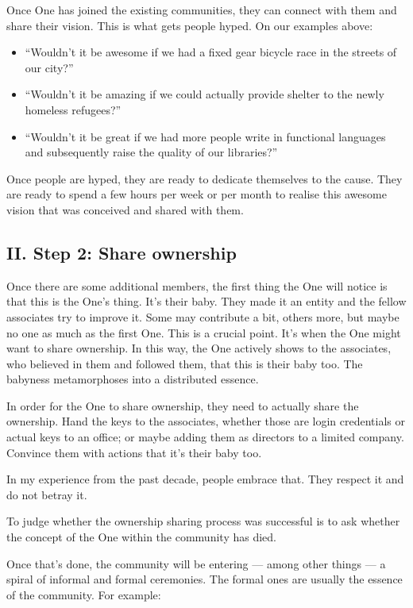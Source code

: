 Once One has joined the existing communities, they can connect with them and share their vision. This is what gets people hyped. On our examples above:

\begin{itemize}
    \item{“Wouldn’t it be awesome if we had a fixed gear bicycle race in the streets of our city?”}
    \item{“Wouldn’t it be amazing if we could actually provide shelter to the newly homeless refugees?”}
    \item{“Wouldn’t it be great if we had more people write in functional languages and subsequently raise the quality of our libraries?”}
\end{itemize}

Once people are hyped, they are ready to dedicate themselves to the cause. They are ready to spend a few hours per week or per month to realise this awesome vision that was conceived and shared with them.

\subsection{II. Step 2: Share ownership}

Once there are some additional members, the first thing the One will notice is that this is the One’s thing. It’s their baby. They made it an entity and the fellow associates try to improve it. Some may contribute a bit, others more, but maybe no one as much as the first One. This is a crucial point. It’s when the One might want to share ownership. In this way, the One actively shows to the associates, who believed in them and followed them, that this is their baby too. The babyness metamorphoses into a distributed essence.

In order for the One to share ownership, they need to actually share the ownership. Hand the keys to the associates, whether those are login credentials or actual keys to an office; or maybe adding them as directors to a limited company. Convince them with actions that it’s their baby too.

In my experience from the past decade, people embrace that. They respect it and do not betray it.

To judge whether the ownership sharing process was successful is to ask whether the concept of the One within the community has died.

Once that’s done, the community will be entering — among other things — a spiral of informal and formal ceremonies. The formal ones are usually the essence of the community. For example:

